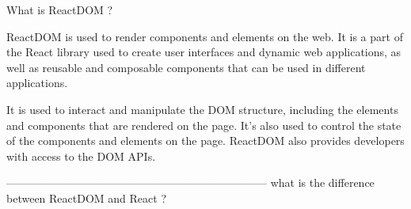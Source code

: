 What is ReactDOM ?

ReactDOM is used to render components and elements on the web. 
It is a part of the React library used to create user interfaces and dynamic web applications, 
as well as reusable and composable components that can be used in different applications.

It is used to interact and manipulate the DOM structure, 
including the elements and components that are rendered on the page. 
It’s also used to control the state of the components and elements on the page. 
ReactDOM also provides developers with access to the DOM APIs.

-----------------------------------------------------------------------
what is the difference between ReactDOM and React ?